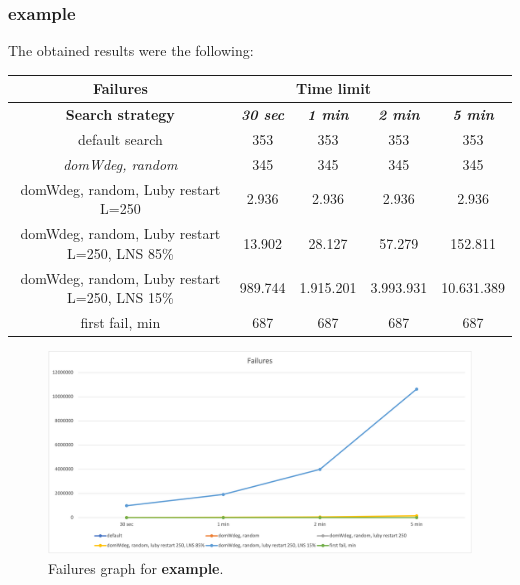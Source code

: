 \subsubsection{example}
\label{subsubsec:example}
The obtained results were the following:
{
\renewcommand{\arraystretch}{2}
\begin{longtable}[h]{| c | c | c | c | c |}
    \hline
    \textbf{Failures} & \multicolumn{3}{c}{Time limit} & \\
    \hline
    \textbf{Search strategy} & \textbf{\textit{30 sec}} & \textbf{\textit{1 min}} & \textbf{\textit{2 min}} & \textbf{\textit{5 min}} \\
    \hline
    \endhead
    default search                                &    353 &     353 &     353 &      353 \\
    \hline
    \textit{domWdeg, random}                      &    345 &     345 &     345 &      345 \\
    \hline
    domWdeg, random, Luby restart L=250           &   2.936 &    2.936 &    2.936 &     2.936 \\
    \hline
    domWdeg, random, Luby restart L=250, LNS 85\% &  13.902 &   28.127 &   57.279 &   152.811 \\
    \hline
    domWdeg, random, Luby restart L=250, LNS 15\% & 989.744 & 1.915.201 & 3.993.931 & 10.631.389 \\
    \hline
    first fail, min                               &    687 &     687 &     687 &      687 \\
    \hline
\end{longtable}
}
\begin{figure}[H]
    \centering
    \includegraphics[width=0.8\columnwidth]{../graphs/example-failures.png}
    \caption{Failures graph for \textbf{example}.}
\end{figure}

